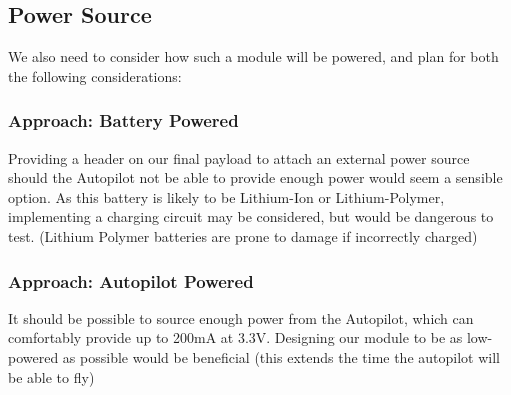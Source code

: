 \subsection{Power Source}

We also need to consider how such a module will be powered, and plan for both the following considerations:

\subsubsection{Approach: Battery Powered}

Providing a header on our final payload to attach an external power source 
should the Autopilot not be able to provide enough power would seem a 
sensible option. As this battery is likely to be Lithium-Ion or 
Lithium-Polymer, implementing a charging circuit may be considered, but would 
be dangerous to test. (Lithium Polymer batteries are prone to damage if incorrectly charged)

\subsubsection{Approach: Autopilot Powered}

It should be possible to source enough power from the Autopilot, which can 
comfortably provide up to 200mA at 3.3V. Designing our module to be as low-powered 
as possible would be beneficial (this extends the time the autopilot will be 
able to fly)



